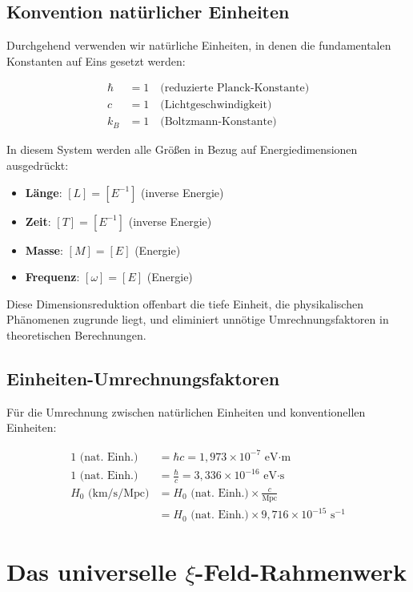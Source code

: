 \documentclass[12pt,a4paper]{article}
\begin{document}
	\subsection{Konvention natürlicher Einheiten}
	
	Durchgehend verwenden wir natürliche Einheiten, in denen die fundamentalen Konstanten auf Eins gesetzt werden:
	
	\begin{align}
		\hbar &= 1 \quad \text{(reduzierte Planck-Konstante)} \\
		c &= 1 \quad \text{(Lichtgeschwindigkeit)} \\
		k_B &= 1 \quad \text{(Boltzmann-Konstante)}
	\end{align}
	
	In diesem System werden alle Größen in Bezug auf Energiedimensionen ausgedrückt:
	\begin{itemize}
		\item \textbf{Länge}: $[L] = [E^{-1}]$ (inverse Energie)
		\item \textbf{Zeit}: $[T] = [E^{-1}]$ (inverse Energie)
		\item \textbf{Masse}: $[M] = [E]$ (Energie)
		\item \textbf{Frequenz}: $[\omega] = [E]$ (Energie)
	\end{itemize}
	
	Diese Dimensionsreduktion offenbart die tiefe Einheit, die physikalischen Phänomenen zugrunde liegt, und eliminiert unnötige Umrechnungsfaktoren in theoretischen Berechnungen.
	
	\subsection{Einheiten-Umrechnungsfaktoren}
	
	Für die Umrechnung zwischen natürlichen Einheiten und konventionellen Einheiten:
	
	\begin{align}
		1 \text{ (nat. Einh.)} &= \hbar c = 1{,}973 \times 10^{-7} \text{ eV·m} \\
		1 \text{ (nat. Einh.)} &= \frac{\hbar}{c} = 3{,}336 \times 10^{-16} \text{ eV·s} \\
		H_0 \text{ (km/s/Mpc)} &= H_0 \text{ (nat. Einh.)} \times \frac{c}{\text{Mpc}} \\
		&= H_0 \text{ (nat. Einh.)} \times 9{,}716 \times 10^{-15} \text{ s}^{-1}
	\end{align}
	
	\section{Das universelle $\xi$-Feld-Rahmenwerk}
	
\end{document}
